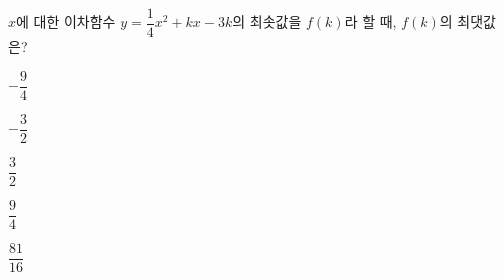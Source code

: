 \hspace*{2mm}\begin{minipage}[t]{\dimexpr\linewidth-2mm\relax}\vspace{0pt}
$x$에 대한 이차함수 $y=\dfrac{1}{4}x^2+kx-3k$의 최솟값을 $f(k)$라 할 때, $f(k)$의 최댓값은?
\begin{choices32}{\rule[-3ex]{0pt}{8ex}$-\dfrac{9}{4}$}{\rule[-3ex]{0pt}{8ex}$-\dfrac{3}{2}$}{\rule[-3ex]{0pt}{8ex}$\dfrac{3}{2}$}{\rule[-3ex]{0pt}{8ex}$\dfrac{9}{4}$}{\rule[-3ex]{0pt}{8ex}$\dfrac{81}{16}$}\end{choices32}\end{minipage}
